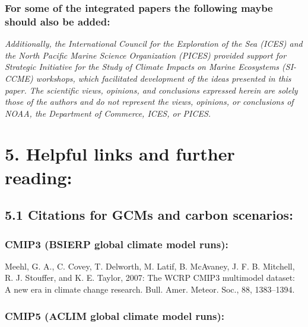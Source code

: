 \documentclass[
]{article}
\begin{document}
\hypertarget{for-some-of-the-integrated-papers-the-following-maybe-should-also-be-added}{%
\subsubsection{For some of the integrated papers the following maybe
should also be
added:}\label{for-some-of-the-integrated-papers-the-following-maybe-should-also-be-added}}

\emph{Additionally, the International Council for the Exploration of the
Sea (ICES) and the North Pacific Marine Science Organization (PICES)
provided support for Strategic Initiative for the Study of Climate
Impacts on Marine Ecosystems (SI-CCME) workshops, which facilitated
development of the ideas presented in this paper. The scientific views,
opinions, and conclusions expressed herein are solely those of the
authors and do not represent the views, opinions, or conclusions of
NOAA, the Department of Commerce, ICES, or PICES.}

\hypertarget{helpful-links-and-further-reading}{%
\section{5. Helpful links and further
reading:}\label{helpful-links-and-further-reading}}

\hypertarget{citations-for-gcms-and-carbon-scenarios}{%
\subsection{5.1 Citations for GCMs and carbon
scenarios:}\label{citations-for-gcms-and-carbon-scenarios}}

\hypertarget{cmip3-bsierp-global-climate-model-runs}{%
\subsubsection{CMIP3 (BSIERP global climate model
runs):}\label{cmip3-bsierp-global-climate-model-runs}}

Meehl, G. A., C. Covey, T. Delworth, M. Latif, B. McAvaney, J. F. B.
Mitchell, R. J. Stouffer, and K. E. Taylor, 2007: The WCRP CMIP3
multimodel dataset: A new era in climate change research. Bull. Amer.
Meteor. Soc., 88, 1383--1394.

\hypertarget{cmip5-aclim-global-climate-model-runs}{%
\subsubsection{CMIP5 (ACLIM global climate model
runs):}\label{cmip5-aclim-global-climate-model-runs}}
\end{document}
